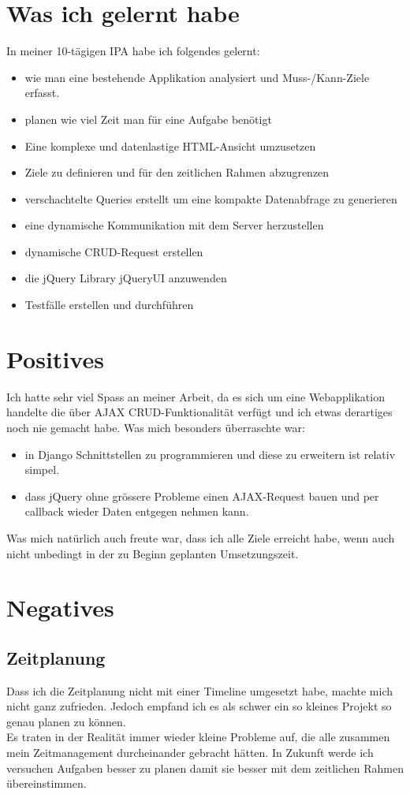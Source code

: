 \section{Was ich gelernt habe}
In meiner 10-tägigen IPA habe ich folgendes gelernt:
\begin{itemize}
    \item wie man eine bestehende Applikation analysiert und Muss-/Kann-Ziele erfasst.
    \item planen wie viel Zeit man für eine Aufgabe benötigt
    \item Eine komplexe und datenlastige HTML-Ansicht umzusetzen
    \item Ziele zu definieren und für den zeitlichen Rahmen abzugrenzen
    \item verschachtelte Queries erstellt um eine kompakte Datenabfrage zu generieren
    \item eine dynamische Kommunikation mit dem Server herzustellen
    \item dynamische CRUD-Request erstellen
    \item die jQuery Library jQueryUI anzuwenden
    \item Testfälle erstellen und durchführen
\end{itemize}
\section{Positives}
Ich hatte sehr viel Spass an meiner Arbeit, da es sich um eine Webapplikation handelte die über AJAX CRUD-Funktionalität verfügt und ich etwas derartiges noch nie gemacht habe.
Was mich besonders überraschte war:
\begin{itemize}
    \item in Django Schnittstellen zu programmieren und diese zu erweitern ist relativ simpel.
    \item dass jQuery ohne grössere Probleme einen AJAX-Request bauen und per callback wieder Daten entgegen nehmen kann.
\end{itemize}
Was mich natürlich auch freute war, dass ich alle Ziele erreicht habe, wenn auch nicht unbedingt in der zu Beginn geplanten Umsetzungszeit.
\section{Negatives}
\subsection{Zeitplanung}
Dass ich die Zeitplanung nicht mit einer Timeline umgesetzt habe, machte mich nicht ganz zufrieden.
Jedoch empfand ich es als schwer ein so kleines Projekt so genau planen zu können.\\
Es traten in der Realität immer wieder kleine Probleme auf, die alle zusammen mein Zeitmanagement durcheinander gebracht hätten.
In Zukunft werde ich versuchen Aufgaben besser zu planen damit sie besser mit dem zeitlichen Rahmen übereinstimmen.
